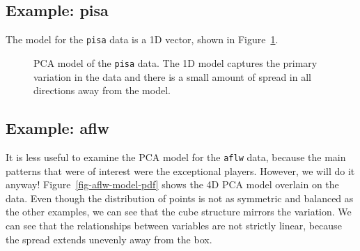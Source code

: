 \documentclass[
  letterpaper,
]{krantz}
\begin{document}
\subsection{Example: pisa}\label{example-pisa-1}


The model for the \texttt{pisa} data is a 1D vector, shown in
Figure~\ref{fig-pisa-model-pdf}.

\begin{figure}


\caption{\label{fig-pisa-model-pdf}PCA model of the \texttt{pisa} data.
The 1D model captures the primary variation in the data and there is a
small amount of spread in all directions away from the model.}

\end{figure}%

\subsection{Example: aflw}\label{example-aflw-1}


It is less useful to examine the PCA model for the \texttt{aflw} data,
because the main patterns that were of interest were the exceptional
players. However, we will do it anyway! Figure~\ref{fig-aflw-model-pdf}
shows the 4D PCA model overlain on the data. Even though the
distribution of points is not as symmetric and balanced as the other
examples, we can see that the cube structure mirrors the variation. We
can see that the relationships between variables are not strictly
linear, because the spread extends unevenly away from the box.
\end{document}
